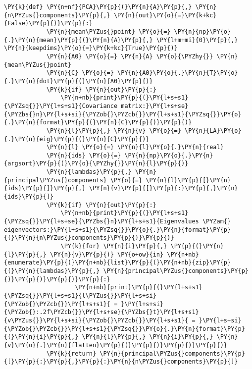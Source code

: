 \begin{Verbatim}[commandchars=\\\{\}]
        \PY{k}{def} \PY{n+nf}{PCA}\PY{p}{(}\PY{n}{A}\PY{p}{,} \PY{n}{n\PYZus{}components}\PY{p}{,} \PY{n}{out}\PY{o}{=}\PY{k+kc}{False}\PY{p}{)}\PY{p}{:}
            \PY{n}{mean\PYZus{}point} \PY{o}{=} \PY{n}{np}\PY{o}{.}\PY{n}{mean}\PY{p}{(}\PY{n}{A}\PY{p}{,} \PY{l+m+mi}{0}\PY{p}{,} \PY{n}{keepdims}\PY{o}{=}\PY{k+kc}{True}\PY{p}{)}
            \PY{n}{A0} \PY{o}{=} \PY{n}{A} \PY{o}{\PYZhy{}} \PY{n}{mean\PYZus{}point}
            \PY{n}{C} \PY{o}{=} \PY{n}{A0}\PY{o}{.}\PY{n}{T}\PY{o}{.}\PY{n}{dot}\PY{p}{(}\PY{n}{A0}\PY{p}{)}
            \PY{k}{if} \PY{n}{out}\PY{p}{:}
                \PY{n+nb}{print}\PY{p}{(}\PY{l+s+s1}{\PYZsq{}}\PY{l+s+s1}{Covariance matrix:}\PY{l+s+se}{\PYZbs{}n}\PY{l+s+si}{\PYZob{}\PYZcb{}}\PY{l+s+s1}{\PYZsq{}}\PY{o}{.}\PY{n}{format}\PY{p}{(}\PY{n}{C}\PY{p}{)}\PY{p}{)}
            \PY{n}{l}\PY{p}{,} \PY{n}{v} \PY{o}{=} \PY{n}{LA}\PY{o}{.}\PY{n}{eig}\PY{p}{(}\PY{n}{C}\PY{p}{)}
            \PY{n}{l} \PY{o}{=} \PY{n}{l}\PY{o}{.}\PY{n}{real}
            \PY{n}{ids} \PY{o}{=} \PY{n}{np}\PY{o}{.}\PY{n}{argsort}\PY{p}{(}\PY{o}{\PYZhy{}}\PY{n}{l}\PY{p}{)}
            \PY{n}{lambdas}\PY{p}{,} \PY{n}{principal\PYZus{}components} \PY{o}{=} \PY{n}{l}\PY{p}{[}\PY{n}{ids}\PY{p}{]}\PY{p}{,} \PY{n}{v}\PY{p}{[}\PY{p}{:}\PY{p}{,}\PY{n}{ids}\PY{p}{]}
            \PY{k}{if} \PY{n}{out}\PY{p}{:}
                \PY{n+nb}{print}\PY{p}{(}\PY{l+s+s1}{\PYZsq{}}\PY{l+s+se}{\PYZbs{}n}\PY{l+s+s1}{Eigenvalues \PYZam{} eigenvectors:}\PY{l+s+s1}{\PYZsq{}}\PY{o}{.}\PY{n}{format}\PY{p}{(}\PY{n}{n\PYZus{}components}\PY{p}{)}\PY{p}{)}
                \PY{k}{for} \PY{n}{i}\PY{p}{,} \PY{p}{(}\PY{n}{l}\PY{p}{,} \PY{n}{v}\PY{p}{)} \PY{o+ow}{in} \PY{n+nb}{enumerate}\PY{p}{(}\PY{n+nb}{list}\PY{p}{(}\PY{n+nb}{zip}\PY{p}{(}\PY{n}{lambdas}\PY{p}{,} \PY{n}{principal\PYZus{}components}\PY{p}{)}\PY{p}{)}\PY{p}{)}\PY{p}{:}
                    \PY{n+nb}{print}\PY{p}{(}\PY{l+s+s1}{\PYZsq{}}\PY{l+s+s1}{l\PYZus{}}\PY{l+s+si}{\PYZob{}\PYZcb{}}\PY{l+s+s1}{ = }\PY{l+s+si}{\PYZob{}:.2f\PYZcb{}}\PY{l+s+se}{\PYZbs{}t}\PY{l+s+s1}{v\PYZus{}}\PY{l+s+si}{\PYZob{}\PYZcb{}}\PY{l+s+s1}{ = }\PY{l+s+si}{\PYZob{}\PYZcb{}}\PY{l+s+s1}{\PYZsq{}}\PY{o}{.}\PY{n}{format}\PY{p}{(}\PY{n}{i}\PY{p}{,} \PY{n}{l}\PY{p}{,} \PY{n}{i}\PY{p}{,} \PY{n}{v}\PY{o}{.}\PY{n}{flatten}\PY{p}{(}\PY{p}{)}\PY{p}{)}\PY{p}{)}
            \PY{k}{return} \PY{n}{principal\PYZus{}components}\PY{p}{[}\PY{p}{:}\PY{p}{,}\PY{p}{:}\PY{n}{n\PYZus{}components}\PY{p}{]}
        

\end{Verbatim}
